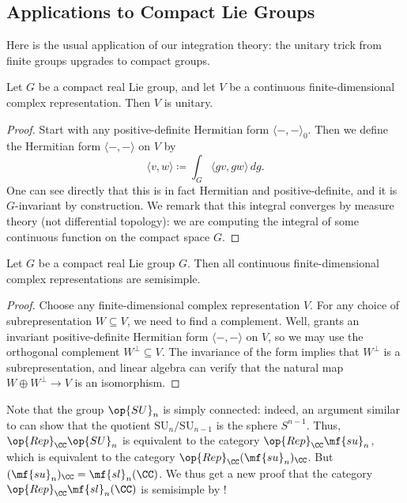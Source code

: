 \documentclass[../notes.tex]{subfiles}
\begin{document}
\subsection{Applications to Compact Lie Groups}
Here is the usual application of our integration theory: the unitary trick from finite groups upgrades to compact groups.
\begin{proposition} \label{prop:weyl-unitary-trick}
	Let $G$ be a compact real Lie group, and let $V$ be a continuous finite-dimensional complex representation. Then $V$ is unitary.
\end{proposition}
\begin{proof}
	Start with any positive-definite Hermitian form $\langle-,-\rangle_0$. Then we define the Hermitian form $\langle-,-\rangle$ on $V$ by
	\[\langle v,w\rangle\coloneqq\int_G\langle gv,gw\rangle\,dg.\]
	One can see directly that this is in fact Hermitian and positive-definite, and it is $G$-invariant by construction. We remark that this integral converges by measure theory (not differential topology): we are computing the integral of some continuous function on the compact space $G$.
\end{proof}
\begin{corollary} \label{cor:reps-semisimple}
	Let $G$ be a compact real Lie group $G$. Then all continuous finite-dimensional complex representations are semisimple.
\end{corollary}
\begin{proof}
	Choose any finite-dimensional complex representation $V$. For any choice of subrepresentation $W\subseteq V$, we need to find a complement. Well,  grants an invariant positive-definite Hermitian form $\langle-,-\rangle$ on $V$, so we may use the orthogonal complement $W^\perp\subseteq V$. The invariance of the form implies that $W^\perp$ is a subrepresentation, and linear algebra can verify that the natural map $W\oplus W^\perp\to V$ is an isomorphism.
\end{proof}
\begin{example}
	Note that the group $\op{SU}_n$ is simply connected: indeed, an argument similar to  can show that the quotient $\mathrm{SU}_n/\mathrm{SU}_{n-1}$ is the sphere $S^{n-1}$. Thus, $\op{Rep}_\CC\op{SU}_n$ is equivalent to the category $\op{Rep}_\CC\mf{su}_n$, which is equivalent to the category $\op{Rep}_\CC(\mf{su}_n)_\CC$. But $(\mf{su}_n)_\CC=\mf{sl}_n(\CC)$. We thus get a new proof that the category $\op{Rep}_\CC\mf{sl}_n(\CC)$ is semisimple by !
\end{example}
\end{document}
